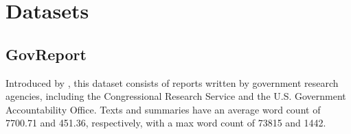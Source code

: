 \section{Datasets}


\subsection*{GovReport}

Introduced by \citet{huang-etal-2021-efficient}, this dataset consists of
reports written by government research agencies, including the Congressional
Research Service and the U.S. Government Accountability Office.
Texts and summaries have an average word count of 7700.71 and 451.36,
respectively, with a max word count of 73815 and 1442.


